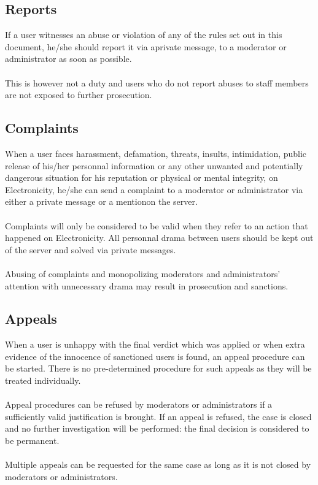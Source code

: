\documentclass[a4paper]{article}
\begin{document}
\subsection{Reports}
If a user witnesses an abuse or violation of any of the rules set out in this document, he/she should report it via aprivate message, to a moderator or administrator as soon as possible.\\
\\
This is however not a duty and users who do not report abuses to staff members are not exposed to further prosecution.

\subsection{Complaints}
When a user faces harassment, defamation, threats, insults, intimidation, public release of his/her personnal information or any other unwanted and potentially dangerous situation for his reputation or physical or mental integrity, on Electronicity, he/she can send a complaint to a moderator or administrator via either a private message or a mentionon the server.\\
\\
Complaints will only be considered to be valid when they refer to an action that happened on Electronicity. All personnal drama between users should be kept out of the server and solved via private messages.\\
\\
Abusing of complaints  and monopolizing moderators and administrators’ attention with unnecessary drama may result in prosecution and sanctions.

\subsection{Appeals}
When a user is unhappy with the final verdict which was applied or when extra evidence of the innocence of sanctioned users is found, an appeal procedure can be started. There is no pre-determined procedure for such appeals as they will be treated individually.\\
\\
Appeal procedures can be refused by moderators or administrators if a sufficiently valid justification is brought. If an appeal is refused, the case is closed and no further investigation will be performed: the final decision is considered to be permanent.\\
\\
Multiple appeals can be requested for the same case as long as it is not closed by moderators or administrators.
\end{document}
